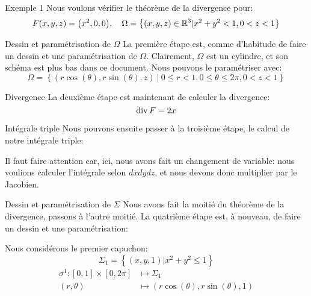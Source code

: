 \documentclass[a4paper]{article}
\begin{document}
\begin{parag}{Exemple 1}
    Nous voulons vérifier le théorème de la divergence pour: 
    \[F\left(x, y, z\right) = \left(x^2, 0, 0\right), \mathspace \Omega = \left\{\left(x, y, z\right) \in \mathbb{R}^3 | x^2 + y^2 < 1, 0 < z < 1\right\}\]
    
    \begin{subparag}{Dessin et paramétrisation de $\Omega$}
        La première étape est, comme d'habitude de faire un dessin et une paramétrisation de $\Omega$. Clairement, $\Omega$ est un cylindre, et son schéma est plus bas dans ce document. Nous pouvons le paramétriser avec: 
        \[\Omega = \left\{\left(r\cos\left(\theta\right), r\sin\left(\theta\right), z\right)\ |\  0 \leq r < 1, 0 \leq \theta\leq 2\pi, 0 < z < 1\right\}\]
    \end{subparag}
    
    \begin{subparag}{Divergence}
        La deuxième étape est maintenant de calculer la divergence: 
        \[\operatorname{div} F = 2x\]
    \end{subparag}
    
    \begin{subparag}{Intégrale triple}
        Nous pouvons ensuite passer à la troisième étape, le calcul de notre intégrale triple: 
        
        Il faut faire attention car, ici, nous avons fait un changement de variable: nous voulions calculer l'intégrale selon $dxdydz$, et nous devons donc multiplier par le Jacobien.
    \end{subparag}

    \begin{subparag}{Dessin et paramétrisation de $\Sigma$}
        Nous avons fait la moitié du théorème de la divergence, passons à l'autre moitié. La quatrième étape est, à nouveau, de faire un dessin et une paramétrisation:

        Nous considérons le premier capuchon:
        \[\Sigma_1 = \left\{\left(x, y, 1\right) | x^2 + y^2 \leq 1\right\}\]
        \[\begin{split}
        \sigma^1: \left[0, 1\right]\times \left[0, 2\pi\right] &\longmapsto \Sigma_{1} \\
        \left(r, \theta\right) &\longmapsto \left(r \cos\left(\theta\right), r\sin\left(\theta\right), 1\right)
        \end{split}\]


\end{subparag}
\end{parag}
\end{document}
